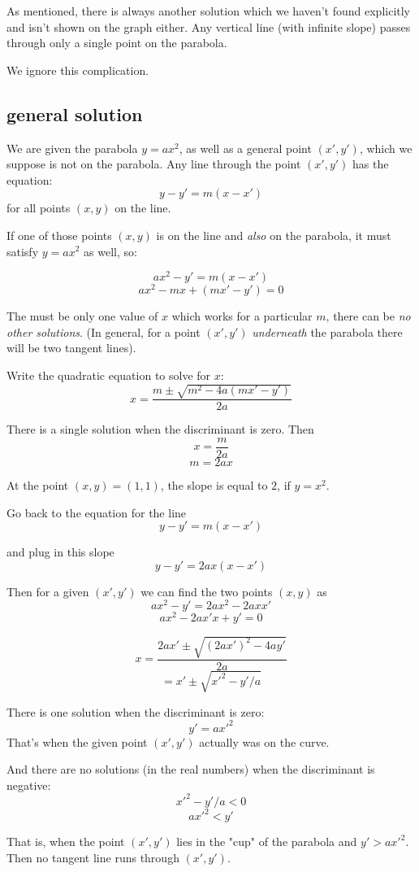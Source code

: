 \documentclass[11pt, oneside]{article}
\begin{document}
As mentioned, there is always another solution which we haven't found explicitly and isn't shown on the graph either.  Any vertical line (with infinite slope) passes through only a single point on the parabola.

We ignore this complication.

\subsection*{general solution}
We are given the parabola $y = ax^2$, as well as a general point $(x',y')$, which we suppose is not on the parabola.  Any line through the point $(x',y')$ has the equation:
\[ y - y' = m(x - x') \]
for all points $(x,y)$ on the line.

If one of those points $(x,y)$ is on the line and \emph{also} on the parabola, it must satisfy $y = ax^2$ as well, so:

\[ ax^2 - y' = m(x - x') \]
\[ ax^2 - mx + (mx' - y') = 0 \]

The must be only one value of $x$ which works for a particular $m$, there can be \emph{no other solutions}.  (In general, for a point $(x',y')$ \emph{underneath} the parabola there will be two tangent lines).

Write the quadratic equation to solve for $x$:
\[ x = \frac{m \pm \sqrt{m^2 - 4a(mx' - y')}}{2a} \]

There is a single solution when the discriminant is zero.  Then
\[ x = \frac{m}{2a} \]
\[ m = 2ax \]

At the point $(x,y) = (1,1)$, the slope is equal to $2$, if $y = x^2$.

Go back to the equation for the line
\[ y - y' = m(x - x') \]

and plug in this slope
\[ y - y' = 2ax(x - x') \]

Then for a given $(x',y')$ we can find the two points $(x,y)$ as
\[ ax^2 - y' = 2ax^2 - 2axx' \]
\[ ax^2 - 2ax'x + y' = 0 \]

\[ x = \frac{2ax' \pm \sqrt{(2ax')^2 - 4ay'}}{2a} \]
\[ = x' \pm \sqrt{x'^2 - y'/a} \]

There is one solution when the discriminant is zero:
\[ y' = ax'^2 \]
That's when the given point $(x',y')$ actually was on the curve.

And there are no solutions (in the real numbers) when the discriminant is negative:
\[ x'^2 - y'/a < 0 \]
\[ ax'^2 < y' \]

That is, when the point $(x',y')$ lies in the "cup" of the parabola and $y' > ax'^2$.  Then no tangent line runs through $(x',y')$.
\end{document}
